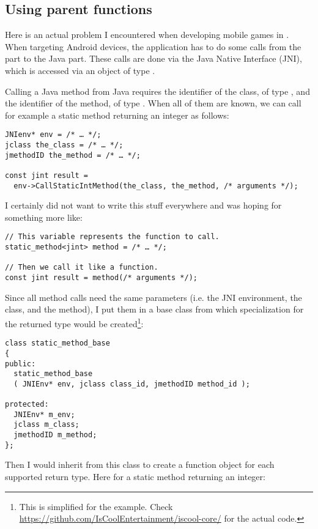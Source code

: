 \subsection{Using parent functions}

\problemtitle

Here is an actual problem I encountered when developing mobile games
in \cpp{}. When targeting Android devices, the application has to do
some calls from the \cpp{} part to the Java part. These calls are done
via the Java Native Interface (JNI), which is accessed via an object
of type .

Calling a Java method from Java requires the identifier of the class,
of type , and the identifier of the method, of type
. When all of them are known, we can call for example
a static method returning an integer as follows:

\begin{lstlisting}
JNIenv* env = /* … */;
jclass the_class = /* … */;
jmethodID the_method = /* … */;

const jint result =
  env->CallStaticIntMethod(the_class, the_method, /* arguments */);
\end{lstlisting}

I certainly did not want to write this stuff everywhere and was hoping
for something more like:

\begin{lstlisting}
// This variable represents the function to call.
static_method<jint> method = /* … */;

// Then we call it like a function.
const jint result = method(/* arguments */);
\end{lstlisting}

Since all method calls need the same parameters (i.e. the JNI
environment, the class, and the method), I put them in a base class
from which specialization for the returned type would be
created\footnote{This is simplified for the example. Check
  \url{https://github.com/IsCoolEntertainment/iscool-core/} for the
  actual code.}:

\begin{lstlisting}
class static_method_base
{
public:
  static_method_base
  ( JNIEnv* env, jclass class_id, jmethodID method_id );

protected:
  JNIEnv* m_env;
  jclass m_class;
  jmethodID m_method;
};
\end{lstlisting}

Then I would inherit from this class to create a function object for
each supported return type. Here for a static method returning an
integer:

